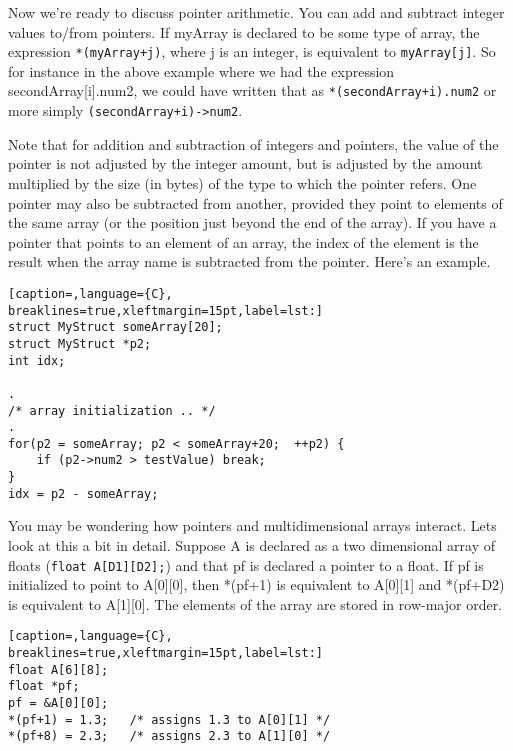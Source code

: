 Now we're ready to discuss pointer arithmetic. You can add and subtract integer
values to/from pointers. If myArray is declared to be some type of array, the
expression \texttt{*(myArray+j)}, where j is an integer, is equivalent to
\texttt{myArray[j]}. So for instance in the above example where we had the
expression secondArray[i].num2, we could have written that as
\texttt{*(secondArray+i).num2} or more simply
\texttt{(secondArray+i)-\textgreater{}num2}.

Note that for addition and subtraction of integers and pointers, the value of
the pointer is not adjusted by the integer amount, but is adjusted by the
amount multiplied by the size (in bytes) of the type to which the pointer
refers. One pointer may also be subtracted from another, provided they point to
elements of the same array (or the position just beyond the end of the array).
If you have a pointer that points to an element of an array, the index of the
element is the result when the array name is subtracted from the pointer.
Here's an example.
\lstset{basicstyle=\scriptsize, numbers=left, captionpos=b, tabsize=4}
\begin{lstlisting}[caption=,language={C},
breaklines=true,xleftmargin=15pt,label=lst:]
struct MyStruct someArray[20];
struct MyStruct *p2;
int idx;

.
/* array initialization .. */
. 
for(p2 = someArray; p2 < someArray+20;  ++p2) {
	if (p2->num2 > testValue) break;
}
idx = p2 - someArray;
\end{lstlisting}

You may be wondering how pointers and multidimensional arrays interact. Lets
look at this a bit in detail. Suppose A is declared as a two dimensional array
of floats (\texttt{float A[D1][D2];}) and that pf is declared a pointer to a
float. If pf is initialized to point to A[0][0], then *(pf+1) is equivalent to
A[0][1] and *(pf+D2) is equivalent to A[1][0]. The elements of the array are
stored in row-major order.
\lstset{basicstyle=\scriptsize, numbers=left, captionpos=b, tabsize=4}
\begin{lstlisting}[caption=,language={C},
breaklines=true,xleftmargin=15pt,label=lst:]
float A[6][8];
float *pf;
pf = &A[0][0]; 
*(pf+1) = 1.3;   /* assigns 1.3 to A[0][1] */
*(pf+8) = 2.3;   /* assigns 2.3 to A[1][0] */
\end{lstlisting}
	

